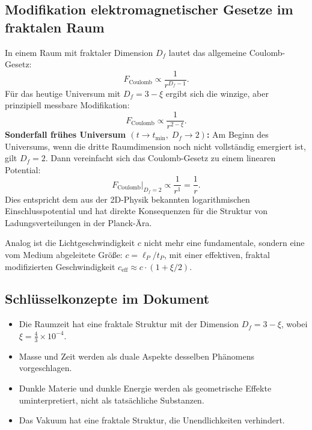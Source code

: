 	\subsection{Modifikation elektromagnetischer Gesetze im fraktalen Raum}
	In einem Raum mit fraktaler Dimension \(D_f\) lautet das allgemeine Coulomb-Gesetz:
	\begin{equation}
		F_{\text{Coulomb}} \propto \frac{1}{r^{D_f - 1}}.
		\label{eq:fractal_coulomb_general}
	\end{equation}
	Für das heutige Universum mit \(D_f = 3-\xi\) ergibt sich die winzige, aber prinzipiell messbare Modifikation:
	\begin{equation}
		F_{\text{Coulomb}} \propto \frac{1}{r^{2 - \xi}}.
		\label{eq:fractal_coulomb}
	\end{equation}
	\textbf{Sonderfall frühes Universum \((t \to t_{\min},\; D_f \to 2)\):}
	Am Beginn des Universums, wenn die dritte Raumdimension noch nicht vollständig emergiert ist, gilt \(D_f = 2\). Dann vereinfacht sich das Coulomb-Gesetz zu einem linearen Potential:
	\begin{equation}
		F_{\text{Coulomb}}\big|_{D_f=2} \propto \frac{1}{r^{1}} = \frac{1}{r}.
		\label{eq:coulomb_df2}
	\end{equation}
	Dies entspricht dem aus der 2D-Physik bekannten logarithmischen Einschlusspotential und hat direkte Konsequenzen für die Struktur von Ladungsverteilungen in der Planck-Ära.

	Analog ist die Lichtgeschwindigkeit \(c\) nicht mehr eine fundamentale, sondern eine vom Medium abgeleitete Größe: \(c = \ell_P / t_P\), mit einer effektiven, fraktal modifizierten Geschwindigkeit \(c_{\text{eff}} \approx c \cdot (1 + \xi/2)\).
	
	\subsection{Schlüsselkonzepte im Dokument}
	\begin{itemize}
		\item Die Raumzeit hat eine fraktale Struktur mit der Dimension \( D_f = 3 - \xi \), wobei \( \xi = \frac{4}{3} \times 10^{-4} \).
		\item Masse und Zeit werden als duale Aspekte desselben Phänomens vorgeschlagen.
		\item Dunkle Materie und dunkle Energie werden als geometrische Effekte uminterpretiert, nicht als tatsächliche Substanzen.
		\item Das Vakuum hat eine fraktale Struktur, die Unendlichkeiten verhindert.
	\end{itemize}
	

